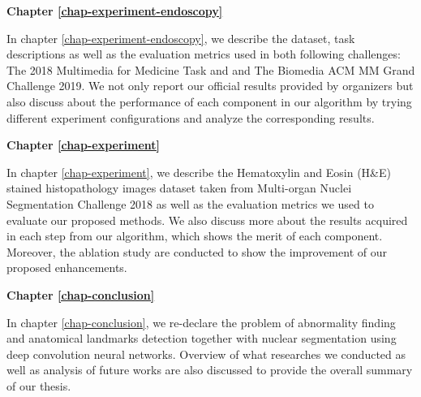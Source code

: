 \textbf{Chapter \ref{chap-experiment-endoscopy}}

In chapter \ref{chap-experiment-endoscopy}, we describe the dataset, task descriptions as well as the evaluation metrics used in both following challenges: The 2018 Multimedia for Medicine Task and and The Biomedia ACM MM Grand Challenge 2019. We not only report our official results provided by organizers but also discuss about the performance of each component in our algorithm by trying different experiment configurations and analyze the corresponding results.


\textbf{Chapter \ref{chap-experiment}}

In chapter \ref{chap-experiment}, we describe the Hematoxylin and Eosin (H\&E) stained histopathology images dataset taken from Multi-organ Nuclei Segmentation Challenge 2018 as well as the evaluation metrics we used to evaluate our proposed methods. We also discuss more about the results acquired in each step from our algorithm, which shows the merit of each component. Moreover, the ablation study are conducted to show the improvement of our proposed enhancements.

\textbf{Chapter \ref{chap-conclusion}}

In chapter \ref{chap-conclusion}, we re-declare the problem of abnormality finding and anatomical landmarks detection together with nuclear segmentation using deep convolution neural networks. Overview of what researches we conducted as well as analysis of future works are also discussed to provide the overall summary of our thesis. 

\begin{ChapAbstract}
\end{ChapAbstract}